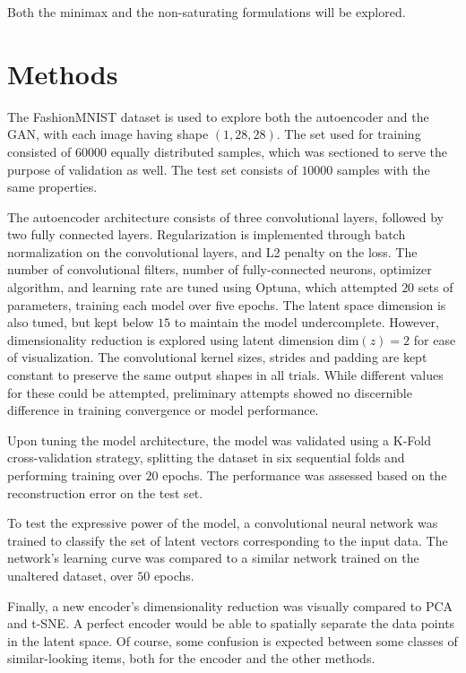 \documentclass[11pt]{article} %
\begin{document}
Both the minimax and the non-saturating formulations will be explored.

\section*{Methods}

The FashionMNIST dataset is used to explore both the autoencoder and the GAN, with each image having shape $\left(1, 28, 28\right)$. The set used for training consisted of $60000$ equally distributed samples, which was sectioned to serve the purpose of validation as well. The test set consists of $10000$ samples with the same properties. 
 
The autoencoder architecture consists of three convolutional layers, followed by two fully connected layers. Regularization is implemented through batch normalization on the convolutional layers, and L2 penalty on the loss. The number of convolutional filters, number of fully-connected neurons, optimizer algorithm, and learning rate are tuned using Optuna, which attempted $20$ sets of parameters, training each model over five epochs. The latent space dimension is also tuned, but kept below $15$ to maintain the model undercomplete. However, dimensionality reduction is explored using latent dimension $\text{dim}(z) = 2$ for ease of visualization. The convolutional kernel sizes, strides and padding are kept constant to preserve the same output shapes in all trials. While different values for these could be attempted, preliminary attempts showed no discernible difference in training convergence or model performance.

\noindent Upon tuning the model architecture, the model was validated using a K-Fold cross-validation strategy, splitting the dataset in six sequential folds and performing training over $20$ epochs. The performance was assessed based on the reconstruction error on the test set.

\noindent To test the expressive power of the model, a convolutional neural network was trained to classify the set of latent vectors corresponding to the input data. The network's learning curve was compared to a similar network trained on the unaltered dataset, over $50$ epochs.

\noindent Finally, a new encoder's dimensionality reduction was visually compared to PCA and t-SNE. A perfect encoder would be able to spatially separate the data points in the latent space. Of course, some confusion is expected between some classes of similar-looking items, both for the encoder and the other methods.
\end{document}
